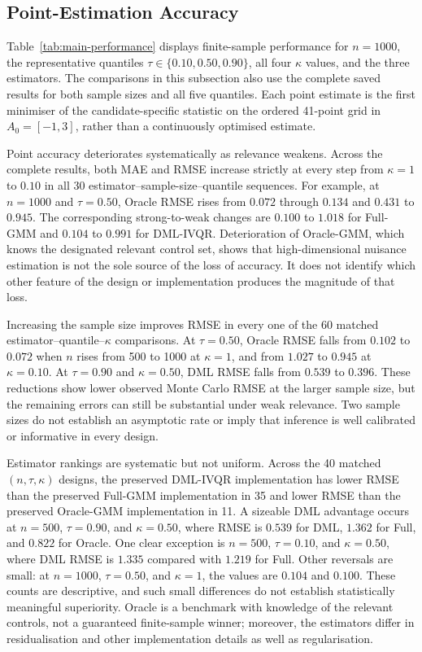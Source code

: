 \subsection{Point-Estimation Accuracy}
\label{sec:results-point-accuracy}

Table~\ref{tab:main-performance} displays finite-sample performance for $n=1000$, the representative quantiles $\tau\in\{0.10,0.50,0.90\}$, all four $\kappa$ values, and the three estimators. The comparisons in this subsection also use the complete saved results for both sample sizes and all five quantiles. Each point estimate is the first minimiser of the candidate-specific statistic on the ordered 41-point grid in $A_0=[-1,3]$, rather than a continuously optimised estimate.



Point accuracy deteriorates systematically as relevance weakens. Across the complete results, both MAE and RMSE increase strictly at every step from $\kappa=1$ to $0.10$ in all 30 estimator--sample-size--quantile sequences. For example, at $n=1000$ and $\tau=0.50$, Oracle RMSE rises from $0.072$ through $0.134$ and $0.431$ to $0.945$. The corresponding strong-to-weak changes are $0.100$ to $1.018$ for Full-GMM and $0.104$ to $0.991$ for DML-IVQR. Deterioration of Oracle-GMM, which knows the designated relevant control set, shows that high-dimensional nuisance estimation is not the sole source of the loss of accuracy. It does not identify which other feature of the design or implementation produces the magnitude of that loss.

Increasing the sample size improves RMSE in every one of the 60 matched estimator--quantile--$\kappa$ comparisons. At $\tau=0.50$, Oracle RMSE falls from $0.102$ to $0.072$ when $n$ rises from 500 to 1000 at $\kappa=1$, and from $1.027$ to $0.945$ at $\kappa=0.10$. At $\tau=0.90$ and $\kappa=0.50$, DML RMSE falls from $0.539$ to $0.396$. These reductions show lower observed Monte Carlo RMSE at the larger sample size, but the remaining errors can still be substantial under weak relevance. Two sample sizes do not establish an asymptotic rate or imply that inference is well calibrated or informative in every design.

Estimator rankings are systematic but not uniform. Across the 40 matched $(n,\tau,\kappa)$ designs, the preserved DML-IVQR implementation has lower RMSE than the preserved Full-GMM implementation in 35 and lower RMSE than the preserved Oracle-GMM implementation in 11. A sizeable DML advantage occurs at $n=500$, $\tau=0.90$, and $\kappa=0.50$, where RMSE is $0.539$ for DML, $1.362$ for Full, and $0.822$ for Oracle. One clear exception is $n=500$, $\tau=0.10$, and $\kappa=0.50$, where DML RMSE is $1.335$ compared with $1.219$ for Full. Other reversals are small: at $n=1000$, $\tau=0.50$, and $\kappa=1$, the values are $0.104$ and $0.100$. These counts are descriptive, and such small differences do not establish statistically meaningful superiority. Oracle is a benchmark with knowledge of the relevant controls, not a guaranteed finite-sample winner; moreover, the estimators differ in residualisation and other implementation details as well as regularisation.

